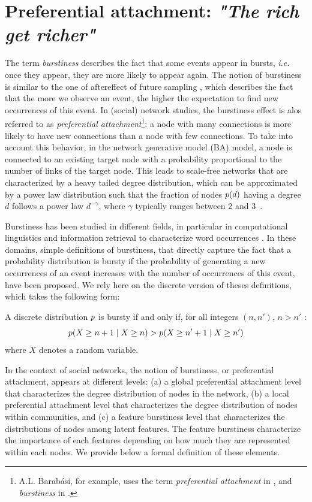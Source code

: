 \section{Preferential attachment: \emph{"The rich get richer"}}
\label{sec:burstiness}

The term \textit{burstiness} describes the fact that some events appear in bursts, \textit{i.e.} once they appear, they are more likely to appear again. The notion of burstiness is similar to the one of aftereffect of future sampling \cite{feller_68}, which describes the fact that the more we observe an event, the higher the expectation to find new occurrences of this event. In (social) network studies, the burstiness effect is alos referred to as \textit{preferential attachment}\footnote{A.L. Barab\'asi, for example, uses the term \textit{preferential attachment} in \cite{barabasi1999emergence}, and \textit{burstiness} in \cite{barabasi_burst}.}: a node with many connections is more likely to have new connections than a node with few connections. To take into account this behavior, in the network generative model  (BA) \cite{albert2002statistical} model, a node is connected to an existing target node with a probability proportional to the number of links of the target node. This leads to scale-free networks that are characterized by a heavy tailed degree distribution, which can be approximated by a power law distribution such that the fraction of nodes $p(d)$ having a degree $d$ follows a power law $d^{-\gamma}$, where $\gamma$ typically ranges between 2 and 3~\cite{barabasi1999emergence}. 

Burstiness has been studied in different fields, in particular in computational linguistics and information retrieval to characterize word occurrences \cite{church1995poisson}. In these domains, simple definitions of burstiness, that directly capture the fact that a probability distribution is bursty if the probability of generating a new occurrences of an event increases with the number of occurrences of this event, have been proposed\cite{clinchant2008bnb,clinchant2010information}. We rely here on the discrete version of theses definitions, which takes the following form:
%
\begin{definition}[Burstiness]
	A discrete distribution $p$ is bursty if and only if, for all integers $(n, n')$, $n > n'$ :
	\begin{equation}
	p(X \geq n+1 \mid X \geq n) > p(X \geq n'+1 \mid X \geq n') \nonumber
	\end{equation}
	where $X$ denotes a random variable.
\label{def:burst}
\end{definition}
%
In the context of social networks, the notion of burstiness, or preferential attachment, appears at different levels: (a) a global preferential attachment level that characterizes the degree distribution of nodes in the network, (b) a local preferential attachment level that characterizes the degree distribution of nodes within communities, and (c) a feature burstiness level that characterizes the distributions of nodes among latent features. The feature burstiness characterize the importance of each features depending on how much they are represented within each nodes. We provide below a formal definition of these elements.
%


